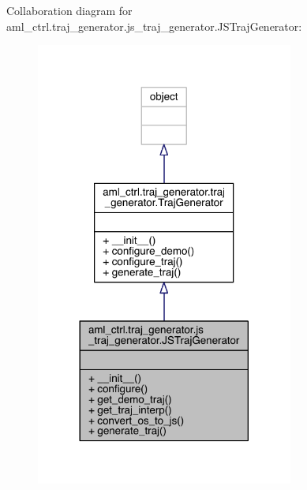 Collaboration diagram for aml\+\_\+ctrl.\+traj\+\_\+generator.\+js\+\_\+traj\+\_\+generator.\+J\+S\+Traj\+Generator\+:\nopagebreak
\begin{figure}[H]
\begin{center}
\leavevmode
\includegraphics[width=240pt]{classaml__ctrl_1_1traj__generator_1_1js__traj__generator_1_1_j_s_traj_generator__coll__graph}
\end{center}
\end{figure}

